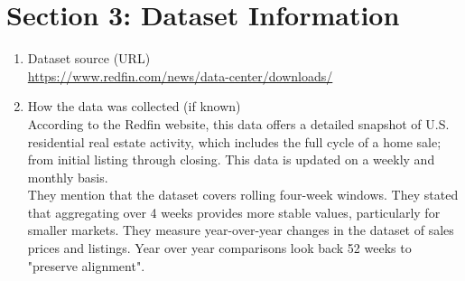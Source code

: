 \documentclass[12pt]{article}
\begin{document}
\section{Section 3: Dataset Information}
\begin{enumerate}
	\item Dataset source (URL)\\
		\url{https://www.redfin.com/news/data-center/downloads/}
	\item How the data was collected (if known)\\
		According to the Redfin website, this data offers a detailed snapshot of U.S. residential real estate activity, which includes the full cycle of a home sale; from initial listing through closing. This data is updated on a weekly and monthly basis. \\
		They mention that the dataset covers rolling four-week windows. They stated that aggregating over 4 weeks provides more stable values, particularly for smaller markets. They measure year-over-year changes in the dataset of sales prices and listings. Year over year comparisons look back 52 weeks to "preserve alignment".


\end{enumerate}
\end{document}
